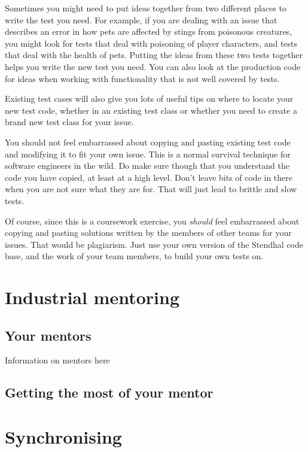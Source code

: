 \documentclass[
]{book}
\begin{document}
Sometimes you might need to put ideas together from two different places to write the test you need. For example, if you are dealing with an issue that describes an error in how pets are affected by stings from poisonous creatures, you might look for tests that deal with poisoning of player characters, and tests that deal with the health of pets. Putting the ideas from these two tests together helps you write the new test you need. You can also look at the production code for ideas when working with functionality that is not well covered by tests.

Existing test cases will also give you lots of useful tips on where to locate your new test code, whether in an existing test class or whether you need to create a brand new test class for your issue.

You should not feel embarrassed about copying and pasting existing test code and modifying it to fit your own issue. This is a normal survival technique for software engineers in the wild. Do make sure though that you understand the code you have copied, at least at a high level. Don't leave bits of code in there when you are not sure what they are for. That will just lead to brittle and slow tests.

Of course, since this is a coursework exercise, you \emph{should} feel embarrassed about copying and pasting solutions written by the members of other teams for your issues. That would be plagiarism. Just use your own version of the Stendhal code base, and the work of your team members, to build your own tests on.

\hypertarget{mentoring}{%
\chapter{Industrial mentoring}\label{mentoring}}

\hypertarget{your-mentors}{%
\section{Your mentors}\label{your-mentors}}

Information on mentors here

\hypertarget{getting-the-most-of-your-mentor}{%
\section{Getting the most of your mentor}\label{getting-the-most-of-your-mentor}}

\hypertarget{syncing}{%
\chapter{Synchronising}\label{syncing}}
\end{document}
